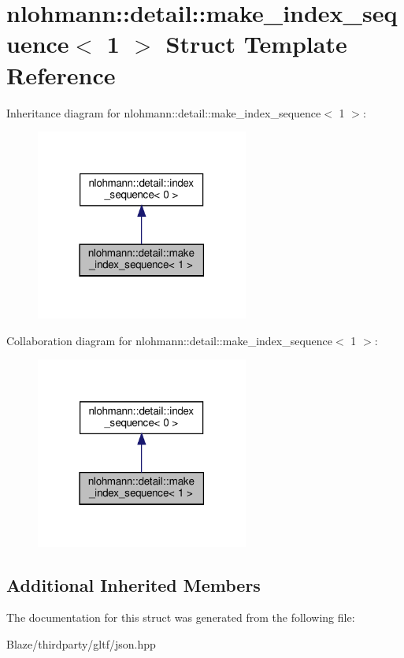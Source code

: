 \hypertarget{structnlohmann_1_1detail_1_1make__index__sequence_3_011_01_4}{}\section{nlohmann\+:\+:detail\+:\+:make\+\_\+index\+\_\+sequence$<$ 1 $>$ Struct Template Reference}
\label{structnlohmann_1_1detail_1_1make__index__sequence_3_011_01_4}


Inheritance diagram for nlohmann\+:\+:detail\+:\+:make\+\_\+index\+\_\+sequence$<$ 1 $>$\+:\nopagebreak
\begin{figure}[H]
\begin{center}
\leavevmode
\includegraphics[width=198pt]{structnlohmann_1_1detail_1_1make__index__sequence_3_011_01_4__inherit__graph}
\end{center}
\end{figure}


Collaboration diagram for nlohmann\+:\+:detail\+:\+:make\+\_\+index\+\_\+sequence$<$ 1 $>$\+:\nopagebreak
\begin{figure}[H]
\begin{center}
\leavevmode
\includegraphics[width=198pt]{structnlohmann_1_1detail_1_1make__index__sequence_3_011_01_4__coll__graph}
\end{center}
\end{figure}
\subsection*{Additional Inherited Members}


The documentation for this struct was generated from the following file\+:\begin{DoxyCompactItemize}
\item 
Blaze/thirdparty/gltf/json.\+hpp\end{DoxyCompactItemize}
